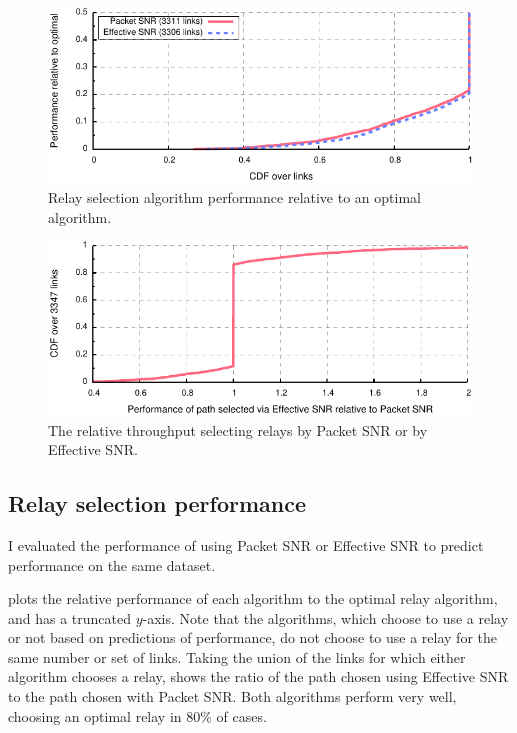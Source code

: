 \begin{figure}[t]
	\centering
	\includegraphics[width=\textwidth]{figures/applications/relay_ratio_opt.pdf}
	\caption[Relay selection algorithm performance relative to an optimal algorithm]{\label{fig:relay_ratio_opt}Relay selection algorithm performance relative to an optimal algorithm.}
\end{figure}
\begin{figure}[t]
	\centering
	\includegraphics[width=\textwidth]{figures/applications/relay_ratio.pdf}
	\caption[The relative throughput selecting relays by Packet SNR or by Effective SNR]{\label{fig:relay_ratio}The relative throughput selecting relays by Packet SNR or by Effective SNR.}
\end{figure}

\subsection{Relay selection performance}
I evaluated the performance of  using Packet SNR or Effective SNR to predict performance on the same dataset.

 plots the relative performance of each algorithm to the optimal relay algorithm, and has a truncated $y$-axis. Note that the algorithms, which choose to use a relay or not based on predictions of performance, do not choose to use a relay for the same number or set of links. Taking the union of the links for which either algorithm chooses a relay,  shows the ratio of the path chosen using Effective SNR to the path chosen with Packet SNR. Both algorithms perform very well, choosing an optimal relay in 80\% of cases.

